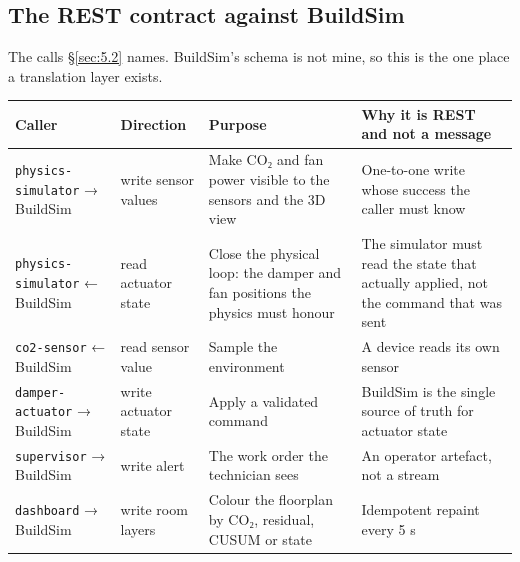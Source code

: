 \subsection{The REST contract against BuildSim}\label{sec:C.3}

The calls \S\ref{sec:5.2} names. BuildSim's schema is not mine, so this is the one place a translation layer
exists.

\begin{longtable}[]{@{}
  >{\raggedright\arraybackslash}p{}
  >{\raggedright\arraybackslash}p{}
  >{\raggedright\arraybackslash}p{}
  >{\raggedright\arraybackslash}p{}@{}}
\toprule
\textbf{Caller} & \textbf{Direction} & \textbf{Purpose} & \textbf{Why it is REST and not a
message} \\
\midrule
\endhead
\texttt{physics-simulator} → BuildSim & write sensor values & Make CO₂ and fan power visible to
the sensors and the 3D view & One-to-one write whose success the caller must know \\
\texttt{physics-simulator} ← BuildSim & read actuator state & Close the physical loop: the damper
and fan positions the physics must honour & The simulator must read the state that actually
applied, not the command that was sent \\
\texttt{co2-sensor} ← BuildSim & read sensor value & Sample the environment & A device reads its
own sensor \\
\texttt{damper-actuator} → BuildSim & write actuator state & Apply a validated command & BuildSim
is the single source of truth for actuator state \\
\texttt{supervisor} → BuildSim & write alert & The work order the technician sees & An operator
artefact, not a stream \\
\texttt{dashboard} → BuildSim & write room layers & Colour the floorplan by CO₂, residual, CUSUM
or state & Idempotent repaint every 5 s \\
\bottomrule
\end{longtable}
